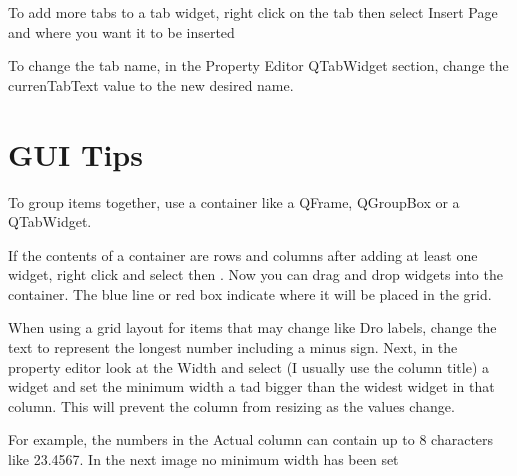 \documentclass[letterpaper,10pt,english]{sphinxmanual}
\begin{document}
\sphinxAtStartPar
To add more tabs to a tab widget, right click on the tab then select Insert
Page and where you want it to be inserted


\sphinxAtStartPar
To change the tab name, in the Property Editor QTabWidget section, change
the currenTabText value to the new desired name.


\sphinxstepscope


\chapter{GUI Tips}
\label{\detokenize{tips:gui-tips}}\label{\detokenize{tips::doc}}
\sphinxAtStartPar
To group items together, use a container like a QFrame, QGroupBox or a
QTabWidget.

\sphinxAtStartPar
If the contents of a container are rows and columns after adding at least one
widget, right click and select  then . Now you can
drag and drop widgets into the container. The blue line or red box indicate
where it will be placed in the grid.


\sphinxAtStartPar
When using a grid layout for items that may change like Dro labels, change the
text to represent the longest number including a minus sign. Next, in the
property editor look at the Width and select (I usually use the column title) a
widget and set the minimum width a tad bigger than the widest widget in that
column. This will prevent the column from resizing as the values change.

\sphinxAtStartPar
For example, the numbers in the Actual column can contain up to 8 characters
like \sphinxhyphen{}23.4567. In the next image no minimum width has been set

\end{document}
